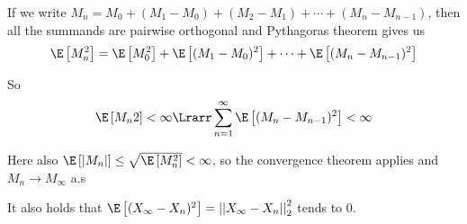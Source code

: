 \noindent If we write $M_n = M_0 + (M_1-M_0)+(M_2-M_1)+\cdots+ (M_n-M_{n-1})$, then all the summands are pairwise orthogonal and Pythagoras theorem gives us
\begin{equation*}
  \begin{gathered}
    \E\left[M_n^2\right] = \E\left[M_0^2\right] + \E\left[(M_1-M_0)^2\right]+\cdots+\E\left[(M_n-M_{n-1})^2\right]
  \end{gathered}
\end{equation*}\par
\noindent So
\begin{equation*}
  \begin{gathered}
    \E\left[M_n2\right]<\infty\Lrarr \sum_{n=1}^{\infty}\E\left[(M_n-M_{n-1})^2\right]<\infty
  \end{gathered}
\end{equation*}\par
\noindent Here also $\E\left[\left|M_n\right|\right]\leq \sqrt{\E\left[M_n^2\right]}<\infty$, so the convergence theorem applies and $M_n\to M_\infty$ a.s
\par\bigskip
\noindent It also holds that $\E\left[(X_\infty-X_n)^2\right] = \left|\left|X_\infty-X_n\right|\right|_2^2$ tends to 0. \par

